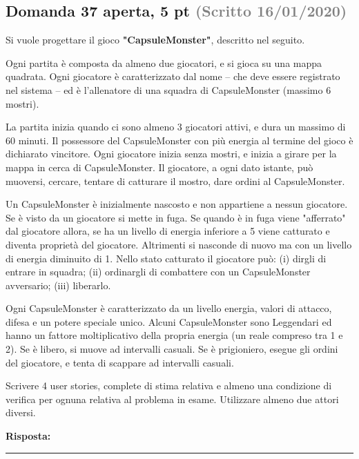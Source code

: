 \documentclass[a4paper,11pt]{article}
\begin{document}
\subsection*{Domanda 37 \hfill {\small aperta, 5 pt \textcolor{gray}{(Scritto 16/01/2020)}}}
\begin{tcolorbox}[colback=gray!8,colframe=gray!50,title=Contesto]
Si vuole progettare il gioco \textbf{"CapsuleMonster"}, descritto nel seguito.

Ogni partita è composta da almeno due giocatori, e si gioca su una mappa quadrata. Ogni giocatore è caratterizzato dal nome – che deve essere registrato nel sistema – ed è l'allenatore di una squadra di CapsuleMonster (massimo 6 mostri).

La partita inizia quando ci sono almeno 3 giocatori attivi, e dura un massimo di 60 minuti. Il possessore del CapsuleMonster con più energia al termine del gioco è dichiarato vincitore. Ogni giocatore inizia senza mostri, e inizia a girare per la mappa in cerca di CapsuleMonster. Il giocatore, a ogni dato istante, può muoversi, cercare, tentare di catturare il mostro, dare ordini al CapsuleMonster.

Un CapsuleMonster è inizialmente nascosto e non appartiene a nessun giocatore. Se è visto da un giocatore si mette in fuga. Se quando è in fuga viene "afferrato" dal giocatore allora, se ha un livello di energia inferiore a 5 viene catturato e diventa proprietà del giocatore. Altrimenti si nasconde di nuovo ma con un livello di energia diminuito di 1. Nello stato catturato il giocatore può: (i) dirgli di entrare in squadra; (ii) ordinargli di combattere con un CapsuleMonster avversario; (iii) liberarlo.

Ogni CapsuleMonster è caratterizzato da un livello energia, valori di attacco, difesa e un potere speciale unico. Alcuni CapsuleMonster sono Leggendari ed hanno un fattore moltiplicativo della propria energia (un reale compreso tra 1 e 2). Se è libero, si muove ad intervalli casuali. Se è prigioniero, esegue gli ordini del giocatore, e tenta di scappare ad intervalli casuali.
\end{tcolorbox}
Scrivere 4 user stories, complete di stima relativa e almeno una condizione di verifica per ognuna relativa al problema in esame. Utilizzare almeno due attori diversi.

\vspace{0.2cm}
\noindent\textbf{Risposta:}\par
\vspace{4cm}\hrule
\end{document}
